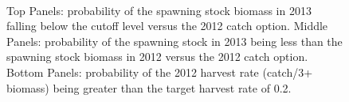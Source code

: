 \begin{figure}
	\centering
		\\
	\caption{Top Panels: probability of the spawning stock biomass in 2013 falling below the cutoff level versus the 2012 catch option. Middle Panels: probability of the spawning stock in 2013 being less than the spawning stock biomass in 2012 versus the 2012 catch option. Bottom Panels: probability of the 2012 harvest rate (catch/3+ biomass) being greater than the target harvest rate of 0.2.}
	\label{fig:Risk}
\end{figure}
 

